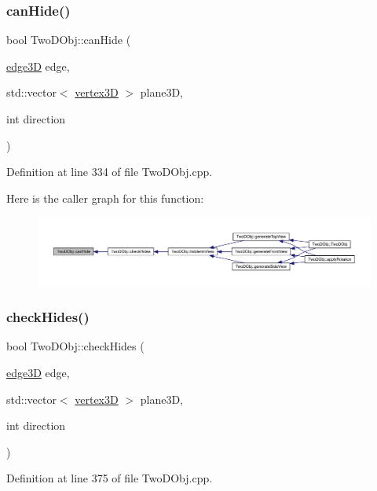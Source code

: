 \subsubsection{\texorpdfstring{can\+Hide()}{canHide()}}
{\footnotesize\ttfamily bool Two\+D\+Obj\+::can\+Hide (\begin{DoxyParamCaption}\item[{\mbox{\hyperlink{structedge3_d}{edge3D}}}]{edge,  }\item[{std\+::vector$<$ \mbox{\hyperlink{structvertex3_d}{vertex3D}} $>$}]{plane3D,  }\item[{int}]{direction }\end{DoxyParamCaption})}



Definition at line 334 of file Two\+D\+Obj.\+cpp.

Here is the caller graph for this function\+:
\nopagebreak
\begin{figure}[H]
\begin{center}
\leavevmode
\includegraphics[width=350pt]{class_two_d_obj_afddeaea49f6d8bc76473a9fa48ff37ef_icgraph}
\end{center}
\end{figure}
\mbox{\label{class_two_d_obj_acd188f5b49cd1d8c21fde2d8646294fe}} 
\subsubsection{\texorpdfstring{check\+Hides()}{checkHides()}}
{\footnotesize\ttfamily bool Two\+D\+Obj\+::check\+Hides (\begin{DoxyParamCaption}\item[{\mbox{\hyperlink{structedge3_d}{edge3D}}}]{edge,  }\item[{std\+::vector$<$ \mbox{\hyperlink{structvertex3_d}{vertex3D}} $>$}]{plane3D,  }\item[{int}]{direction }\end{DoxyParamCaption})}



Definition at line 375 of file Two\+D\+Obj.\+cpp.

